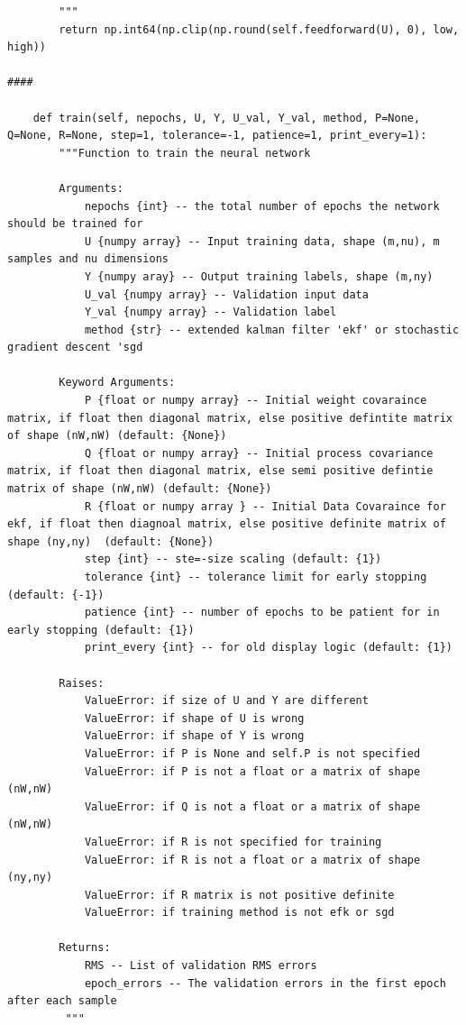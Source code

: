\documentclass{article}
\begin{document}
\begin{verbatim}
        """
        return np.int64(np.clip(np.round(self.feedforward(U), 0), low, high))

####

    def train(self, nepochs, U, Y, U_val, Y_val, method, P=None, Q=None, R=None, step=1, tolerance=-1, patience=1, print_every=1):
        """Function to train the neural network
        
        Arguments:
            nepochs {int} -- the total number of epochs the network should be trained for
            U {numpy array} -- Input training data, shape (m,nu), m samples and nu dimensions
            Y {numpy aray} -- Output training labels, shape (m,ny)
            U_val {numpy array} -- Validation input data
            Y_val {numpy array} -- Validation label
            method {str} -- extended kalman filter 'ekf' or stochastic gradient descent 'sgd
        
        Keyword Arguments:
            P {float or numpy array} -- Initial weight covaraince matrix, if float then diagonal matrix, else positive defintite matrix of shape (nW,nW) (default: {None})
            Q {float or numpy array} -- Initial process covariance matrix, if float then diagonal matrix, else semi positive defintie matrix of shape (nW,nW) (default: {None})
            R {float or numpy array } -- Initial Data Covaraince for ekf, if float then diagnoal matrix, else positive definite matrix of shape (ny,ny)  (default: {None})
            step {int} -- ste=-size scaling (default: {1})
            tolerance {int} -- tolerance limit for early stopping (default: {-1})
            patience {int} -- number of epochs to be patient for in early stopping (default: {1})
            print_every {int} -- for old display logic (default: {1})
        
        Raises:
            ValueError: if size of U and Y are different 
            ValueError: if shape of U is wrong
            ValueError: if shape of Y is wrong
            ValueError: if P is None and self.P is not specified
            ValueError: if P is not a float or a matrix of shape (nW,nW)
            ValueError: if Q is not a float or a matrix of shape (nW,nW)
            ValueError: if R is not specified for training
            ValueError: if R is not a float or a matrix of shape (ny,ny)
            ValueError: if R matrix is not positive definite 
            ValueError: if training method is not efk or sgd
        
        Returns:
            RMS -- List of validation RMS errors 
            epoch_errors -- The validation errors in the first epoch after each sample  
         """


\end{verbatim}
\end{document}
